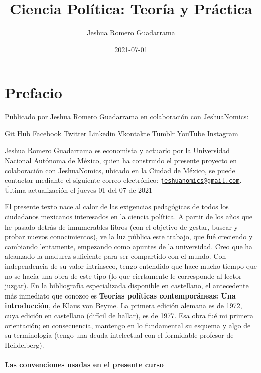 \documentclass[
]{book}
\title{Ciencia Política: Teoría y Práctica}
\author{Jeshua Romero Guadarrama}
\date{2021-07-01}
\begin{document}
\maketitle

{
\setcounter{tocdepth}{1}
\tableofcontents
}
\hypertarget{prefacio}{%
\chapter*{Prefacio}\label{prefacio}}

Publicado por Jeshua Romero Guadarrama en colaboración con JeshuaNomics:

{ Git Hub}
{ Facebook}
{ Twitter}
{ Linkedin}
{ Vkontakte}
{ Tumblr}
{ YouTube}
{ Instagram}

Jeshua Romero Guadarrama es economista y actuario por la Universidad Nacional Autónoma de México, quien ha construido el presente proyecto en colaboración con JeshuaNomics, ubicado en la Ciudad de México, se puede contactar mediante el siguiente correo electrónico: \href{mailto:jeshuanomics@gmail.com}{\nolinkurl{jeshuanomics@gmail.com}}.
Última actualización el jueves 01 del 07 de 2021

El presente texto nace al calor de las exigencias pedagógicas de todos los ciudadanos mexicanos interesados en la ciencia política. A partir de los años que he pasado detrás de innumerables libros (con el objetivo de gestar, buscar y probar nuevos conocimientos), ve la luz pública este trabajo, que fué creciendo y cambiando lentamente, empezando como apuntes de la universidad. Creo que ha alcanzado la madurez suficiente para ser compartido con el mundo. Con independencia de su valor intrínseco, tengo entendido que hace mucho tiempo que no se hacía una obra de este tipo (lo que ciertamente le corresponde al lector juzgar). En la bibliografía especializada disponible en castellano, el antecedente más inmediato que conozco es \textbf{Teorías políticas contemporáneas: Una introducción}, de Klaus von Beyme. La primera edición alemana es de 1972, cuya edición en castellano (difícil de hallar), es de 1977. Esa obra fué mi primera orientación; en consecuencia, mantengo en lo fundamental su esquema y algo de su terminología (tengo una deuda intelectual con el formidable profesor de Heildelberg).

\hypertarget{las-convenciones-usadas-en-el-presente-curso}{%
\subsubsection*{Las convenciones usadas en el presente curso}\label{las-convenciones-usadas-en-el-presente-curso}}
\end{document}
